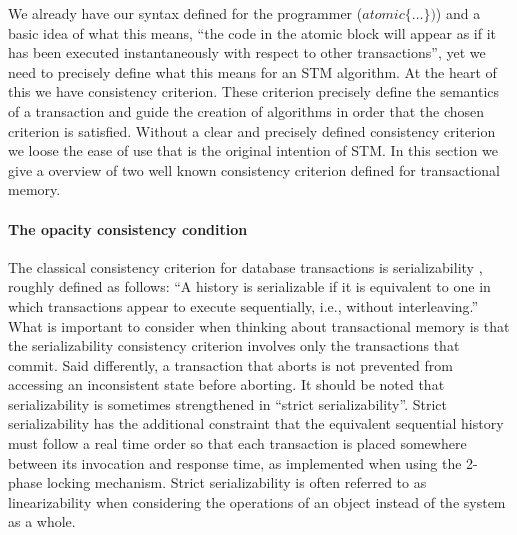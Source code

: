 \documentclass[runningheads,a4paper]{article}
\begin{document}
We already have our syntax defined for the programmer ($atomic\{ \dots \})$) and
a basic idea of what this means, ``the code in the atomic block will appear as if
it has been executed instantaneously with respect to other transactions'', yet we need to precisely define what this
means for an STM algorithm.
At the heart of this we have consistency criterion.
These criterion precisely define the semantics of a transaction and guide the creation
of algorithms in order that the chosen criterion is satisfied.
Without a clear and precisely defined consistency criterion we loose the ease of use
that is the original intention of STM.
In this section we give a overview of two well known consistency criterion
defined for transactional memory.


\paragraph{The opacity consistency condition}
The classical consistency criterion for database
transactions is serializability \cite{P79},
roughly defined as follows: ``A history is serializable if it is equivalent to one in which
transactions appear to execute sequentially, i.e., without interleaving.''
What is important to consider when thinking about transactional memory
is that the serializability  consistency criterion 
involves only the transactions that commit. Said differently, 
a transaction  that aborts is not prevented from accessing an inconsistent
state   before aborting. 
It should be noted that serializability is sometimes strengthened in ``strict
serializability''.
Strict serializability has the additional constraint that the equivalent sequential history
must follow a real time order so that each transaction is placed somewhere between its
invocation and response time,
as  implemented  when   using   the   2-phase  locking
mechanism.
Strict serializability is often referred to as linearizability \cite{HW90}  when considering the operations
of an object instead of the system as a whole.
\end{document}

